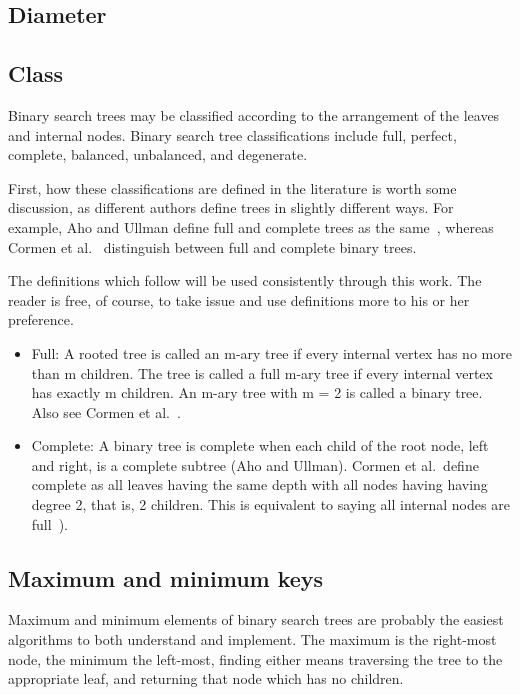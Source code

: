 \documentclass{article}
\begin{document}
\subsection{Diameter}

\subsection{Class}

Binary search trees may be classified according to the
arrangement of the leaves and internal nodes.
Binary search tree classifications include
full, perfect, complete, balanced, unbalanced, and degenerate.

First, how these classifications are defined in the literature is
worth some discussion, as different authors define trees in slightly
different ways. For example, Aho and Ullman define full and complete
trees as the same~\cite[p. 257]{aho:av:1992}, whereas Cormen
et al.~\cite[p. 1178]{cormen:th2009} distinguish between full and
complete binary trees.

The definitions which follow will be used consistently through this
work. The reader is free, of course, to take issue and use definitions
more to his or her preference.

\begin{itemize}
  \item Full: A rooted tree is called an m-ary tree if every internal
    vertex has no more than m children. The tree is called a full m-ary
    tree if every internal vertex has exactly m children. An m-ary tree
    with m = 2 is called a binary tree.~\cite[p. 748]{rosen} Also see
    Cormen et al.~\cite[p. 1178]{cormen:th2009}.

  \item Complete: A binary tree is complete when each child of the root node,
    left and right, is a complete subtree (Aho and Ullman). Cormen et al.\
    define complete as all leaves having the same depth with all nodes having
    having degree 2, that is, 2 children. This is equivalent to saying all
    internal nodes are full~\cite[p. 1179]{cormen:th2009}).
\end{itemize}

\subsection{Maximum and minimum keys}

\setcounter{sno}{0}

\sno Maximum and minimum elements of binary search trees are probably the easiest
algorithms to both understand and implement. \sno The maximum is the right-most
node, the minimum the left-most, finding either means traversing the tree
to the appropriate leaf, and returning that node which has no children.
\end{document}
